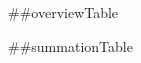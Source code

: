 \documentclass[11pt, landscape]{article}%
\begin{document}
##overviewTable

\newpage

##summationTable
\end{document}
